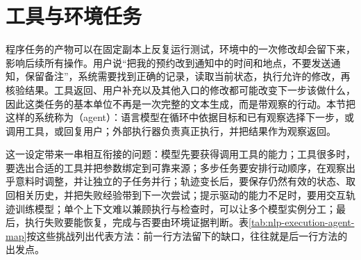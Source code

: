 \section{工具与环境任务}
\label{sec:nlp-execution-environment}

程序任务的产物可以在固定副本上反复运行测试，环境中的一次修改却会留下来，影响后续所有操作。用户说“把我的预约改到通知中的时间和地点，不要发送通知，保留备注”，系统需要找到正确的记录，读取当前状态，执行允许的修改，再核验结果。工具返回、用户补充以及其他入口的修改都可能改变下一步该做什么，因此这类任务的基本单位不再是一次完整的文本生成，而是带观察的行动。本节把这样的系统称为（agent）：语言模型在循环中依据目标和已有观察选择下一步，或调用工具，或回复用户；外部执行器负责真正执行，并把结果作为观察返回。

这一设定带来一串相互衔接的问题：模型先要获得调用工具的能力；工具很多时，要选出合适的工具并把参数绑定到可靠来源；多步任务要安排行动顺序，在观察出乎意料时调整，并让独立的子任务并行；轨迹变长后，要保存仍然有效的状态、取回相关历史，并把失败经验带到下一次尝试；提示驱动的能力不足时，要用交互轨迹训练模型；单个上下文难以兼顾执行与检查时，可以让多个模型实例分工；最后，执行失败要能恢复，完成与否要由环境证据判断。表\ref{tab:nlp-execution-agent-map}按这些挑战列出代表方法：前一行方法留下的缺口，往往就是后一行方法的出发点。


